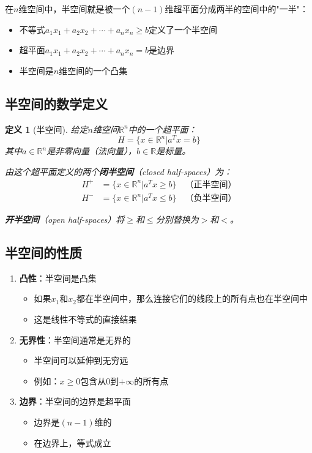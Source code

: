 \documentclass[12pt,a4paper]{article}
\newtheorem{definition}{定义}
\begin{document}
在$n$维空间中，半空间就是被一个$(n-1)$维超平面分成两半的空间中的"一半"：

\begin{itemize}
\item 不等式$a_1 x_1 + a_2 x_2 + \cdots + a_n x_n \geq b$定义了一个半空间
\item 超平面$a_1 x_1 + a_2 x_2 + \cdots + a_n x_n = b$是边界
\item 半空间是$n$维空间的一个凸集
\end{itemize}

\subsection{半空间的数学定义}

\begin{definition}[半空间]
给定$n$维空间$\mathbb{R}^n$中的一个超平面：
\begin{equation}
H = \{x \in \mathbb{R}^n | a^T x = b\}
\end{equation}
其中$a \in \mathbb{R}^n$是非零向量（法向量），$b \in \mathbb{R}$是标量。

由这个超平面定义的两个\textbf{闭半空间}（closed half-spaces）为：
\begin{align}
H^+ &= \{x \in \mathbb{R}^n | a^T x \geq b\} \quad \text{（正半空间）} \\
H^- &= \{x \in \mathbb{R}^n | a^T x \leq b\} \quad \text{（负半空间）}
\end{align}

\textbf{开半空间}（open half-spaces）将$\geq$和$\leq$分别替换为$>$和$<$。
\end{definition}

\subsection{半空间的性质}

\begin{enumerate}
\item \textbf{凸性}：半空间是凸集
  \begin{itemize}
  \item 如果$x_1$和$x_2$都在半空间中，那么连接它们的线段上的所有点也在半空间中
  \item 这是线性不等式的直接结果
  \end{itemize}

\item \textbf{无界性}：半空间通常是无界的
  \begin{itemize}
  \item 半空间可以延伸到无穷远
  \item 例如：$x \geq 0$包含从0到$+\infty$的所有点
  \end{itemize}

\item \textbf{边界}：半空间的边界是超平面
  \begin{itemize}
  \item 边界是$(n-1)$维的
  \item 在边界上，等式成立
  \end{itemize}
\end{enumerate}
\end{document}
